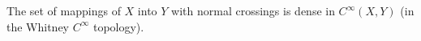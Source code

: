 The set of mappings of $X$ into $Y$ with normal crossings is dense in $C^\infty(X, Y)$ (in the Whitney $C^\infty$ topology).
